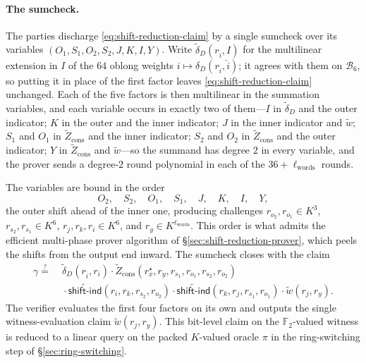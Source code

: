 \documentclass{article}
\theoremstyle{definition}
\newcommand*{\mle}{\widetilde}
\newcommand{\BB}{\mathcal{B}}
\newcommand{\FF}[1]{\mathbb{F}_{#1}}
\begin{document}
\paragraph{The sumcheck.}
The parties discharge \eqref{eq:shift-reduction-claim} by a single sumcheck over its variables $(O_1, S_1, O_2, S_2, J, K, I, Y)$. Write $\mle{\delta}_D(r_{\widehat{i}}, I)$ for the multilinear extension in $I$ of the $64$ oblong weights $i \mapsto \delta_D(r_{\widehat{i}}, \widehat{i})$; it agrees with them on $\BB_6$, so putting it in place of the first factor leaves \eqref{eq:shift-reduction-claim} unchanged. Each of the five factors is then multilinear in the summation variables, and each variable occurs in exactly two of them---$I$ in $\mle{\delta}_D$ and the outer indicator; $K$ in the outer and the inner indicator; $J$ in the inner indicator and $\mle{w}$; $S_1$ and $O_1$ in $\mle{Z}_\text{cons}$ and the inner indicator; $S_2$ and $O_2$ in $\mle{Z}_\text{cons}$ and the outer indicator; $Y$ in $\mle{Z}_\text{cons}$ and $\mle{w}$---so the summand has degree $2$ in every variable, and the prover sends a degree-$2$ round polynomial in each of the $36 + \ell_\text{words}$ rounds.

The variables are bound in the order
\[
  O_2, \quad S_2, \quad O_1, \quad S_1, \quad J, \quad K, \quad I, \quad Y,
\]
the outer shift ahead of the inner one, producing challenges $r_{o_2}, r_{o_1} \in K^3$, $r_{s_2}, r_{s_1} \in K^6$, $r_j, r_k, r_i \in K^6$, and $r_y \in K^{\ell_\text{words}}$. This order is what admits the efficient multi-phase prover algorithm of \S\ref{sec:shift-reduction-prover}, which peels the shifts from the output end inward. The sumcheck closes with the claim
\begin{align*}
  \gamma \stackrel{?}{=} \; &\mle{\delta}_D(r_{\widehat{i}}, r_i) \cdot \mle{Z}_\text{cons}(r^\star_x, r_y, r_{s_1}, r_{o_1}, r_{s_2}, r_{o_2}) \\
  &{} \cdot \mle{\textsf{shift-ind}}(r_i, r_k, r_{s_2}, r_{o_2}) \cdot \mle{\textsf{shift-ind}}(r_k, r_j, r_{s_1}, r_{o_1}) \cdot \mle{w}(r_j, r_y).
\end{align*}
The verifier evaluates the first four factors on its own and outputs the single witness-evaluation claim $\mle{w}(r_j, r_y)$. This bit-level claim on the $\FF{2}$-valued witness is reduced to a linear query on the packed $K$-valued oracle $\pi$ in the ring-switching step of \S\ref{sec:ring-switching}.
\end{document}
